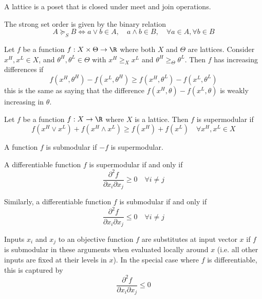 \begin{definition}[Lattice]
  A lattice is a poset that is closed under meet and join operations.
\end{definition}

\begin{definition}
  The strong set order is given by the binary relation
  \[
  A \succeq_S B \iff
  a \vee b \in A, \quad
  a \wedge b \in B, \quad
  \forall a \in A, \forall b \in B
  \]
\end{definition}

\begin{definition}
  Let $f$ be a function $f : X \times \Theta \to \R$ where both $X$
  and $\Theta$ are lattices. Consider $x^H, x^L \in X$, and $\theta^H,
  \theta^L \in \Theta$ with $x^H \geq_X x^L$ and $\theta^H \geq_\Theta
  \theta^L$. Then $f$ has increasing differences if
  \[
  f(x^H, \theta^H) - f(x^L, \theta^H) \geq
  f(x^H, \theta^L) - f(x^L, \theta^L)
  \]
  this is the same as saying that the difference $f(x^H, \theta) -
  f(x^L, \theta)$ is weakly increasing in $\theta$.
\end{definition}

\begin{definition}[Supermodularity]
  Let $f$ be a function $f : X \to \R$ where $X$ is a lattice. Then
  $f$ is supermodular if
  \[
  f(x^H \vee x^L) + f(x^H \wedge x^L) \geq f(x^H) + f(x^L) \quad
  \forall x^H, x^L \in X
  \]
\end{definition}

\begin{definition}[Submodularity]
  A function $f$ is submodular if $-f$ is supermodular.
\end{definition}

\begin{prop}
  A differentiable function $f$ is supermodular if and only if
  \[
  \frac{\partial^2 f}{\partial x_i \partial x_j} \geq 0
  \quad \forall i \neq j
  \]

 Similarly, a differentiable function $f$ is submodular if and only if
  \[
  \frac{\partial^2 f}{\partial x_i \partial x_j} \leq 0
  \quad \forall i \neq j
  \]
\end{prop}

\begin{definition}[Substitutes]
  Inputs $x_i$ and $x_j$ to an objective function $f$ are substitutes
  at input vector $x$ if $f$ is submodular in these arguments when
  evaluated locally around $x$ (i.e. all other inputs are fixed at
  their levels in $x$). In the special case where $f$ is
  differentiable, this is captured by
  \[
  \frac{\partial^2 f}{\partial x_i \partial x_j} \leq 0
  \]
\end{definition}

